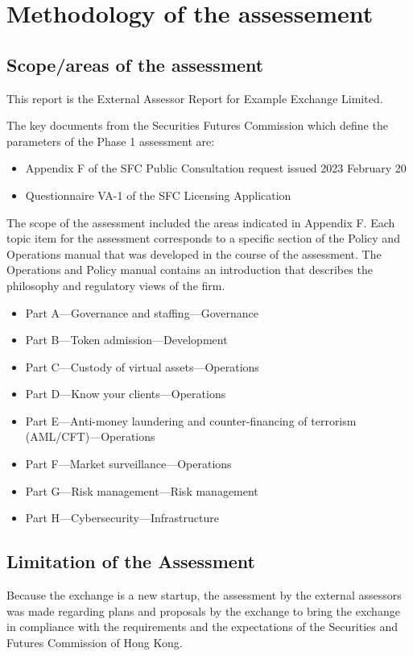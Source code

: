 \documentclass[]{report}
\def\firmfullname{Example Exchange Limited}
\begin{document}
\chapter{Methodology of the assessement}
\section{Scope/areas of the assessment}

This report is the External Assessor Report for \firmfullname.  

The key documents from the Securities Futures Commission which define
the parameters of the Phase 1 assessment are:

\begin{itemize}
  \item Appendix F of the SFC Public Consultation request issued
    2023 February 20
  \item Questionnaire VA-1 of the SFC Licensing Application
\end{itemize}

The scope of the assessment included the areas indicated in Appendix
F.  Each topic item for the assessment corresponds to a specific
section of the Policy and Operations manual that was developed in the
course of the assessment.  The Operations and Policy manual contains
an introduction that describes the philosophy and regulatory views of
the firm.

\begin{itemize}
\item Part A—Governance and staffing—Governance
\item Part B—Token admission—Development
\item Part C—Custody of virtual assets—Operations
\item Part D—Know your clients—Operations
\item Part E—Anti-money laundering and counter-financing of
  terrorism (AML/CFT)—Operations
\item Part F—Market surveillance—Operations
\item Part G—Risk management—Risk management
\item Part H—Cybersecurity—Infrastructure
\end{itemize}


\section{Limitation of the Assessment}
Because the exchange is a new startup, the assessment by the external
assessors was made regarding plans and proposals by the
exchange to bring the exchange in compliance with the
requirements and the expectations of the Securities and Futures
Commission of Hong Kong.
\end{document}
